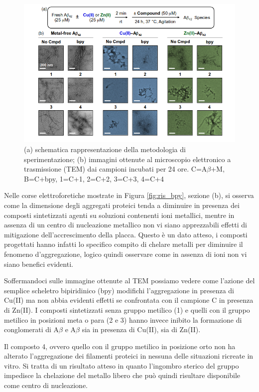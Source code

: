 \documentclass[a4paper, 12pt]{article}
\begin{document}
\begin{figure}[H]
	\centering
	\includegraphics[width=\linewidth]{immagini/ris_bpy2.png}
	\caption{(a) schematica rappresentazione della metodologia di sperimentazione; (b) immagini ottenute al microscopio elettronico a trasmissione (TEM) dai campioni incubati per 24 ore. C=A$\beta$+M, B=C+bpy, 1=C+1, 2=C+2, 3=C+3, 4=C+4 }
	\label{fig:ris_bpy2}
\end{figure}

Nelle corse elettroforetiche mostrate in Figura \ref{fig:ris_bpy}, sezione (b), si osserva come la dimensione degli aggregati proteici tenda a diminuire in presenza dei composti sintetizzati agenti su soluzioni contenenti ioni metallici, mentre in assenza di un centro di nucleazione metallico non vi siano apprezzabili effetti di mitigazione dell'accrescimento della placca. Questo è un dato atteso, i composti progettati hanno infatti lo specifico compito di chelare metalli per diminuire il fenomeno d'aggregazione, logico quindi osservare come in assenza di ioni non vi siano benefici evidenti.

Soffermandoci sulle immagine ottenute al TEM possiamo vedere come l'azione del semplice scheletro bipiridinico (bpy) modifichi l'aggregazione in presenza di Cu(II) ma non abbia evidenti effetti se confrontata con il campione C in presenza di Zn(II). I composti sintetizzati senza gruppo metilico (1) e quelli con il gruppo metilico in posizioni meta o para (2 e 3) hanno invece inibito la formazione di conglomerati di A$\beta$ e A$\beta$ sia in presenza di Cu(II), sia di Zn(II).

Il composto 4, ovvero quello con il gruppo metilico in posizione orto non ha alterato l’aggregazione dei filamenti proteici in nessuna delle situazioni ricreate in vitro. Si tratta di un risultato atteso in quanto l’ingombro sterico del gruppo  impedisce la chelazione del metallo libero che può quindi risultare disponibile come centro di nucleazione.
\end{document}
